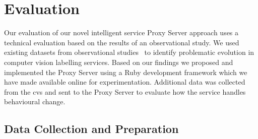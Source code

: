 







\section{Evaluation}
\label{fse2020:sec:eval}

Our evaluation of our novel intelligent service Proxy Server approach uses a technical evaluation based on the results of an observational study. We used existing datasets from observational studies~\citep{Cummaudo:2019icsme,Lin:2014vma} to identify problematic evolution in computer vision labelling services. Based on our findings we proposed and implemented the Proxy Server using a Ruby development framework which we have made available online for experimentation. Additional data was collected from the \gls{cvs} and sent to the Proxy Server to evaluate how the service handles behavioural change. 

\subsection{Data Collection and Preparation}


